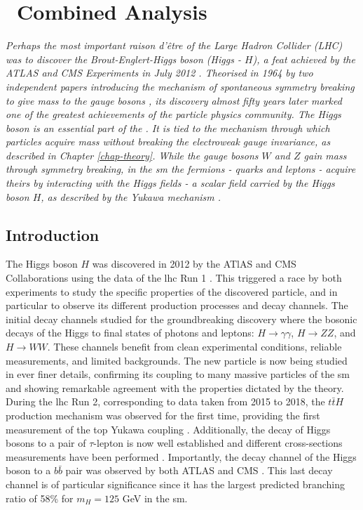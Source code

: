 \chapter[\boldvhbc\ Combined Analysis]{\vhbc\ Combined Analysis}\label{chap-VH}
\ChapFrame

\textit{Perhaps the most important \textit{raison d'être} of the \textit{Large Hadron Collider} (LHC) was to discover the Brout-Englert-Higgs boson (Higgs - $H$), a feat achieved by the ATLAS and CMS Experiments in July 2012 \cite{ATLAS:2012yve, CMS:2012qbp}. Theorised in 1964 by two independent papers introducing the mechanism of spontaneous symmetry breaking to give mass to the gauge bosons \cite{Englert:1964et,  PhysRevLett.13.508}, its discovery almost fifty years later marked one of the greatest achievements of the particle physics community. The Higgs boson is an essential part of the . It is tied to the mechanism through which particles acquire mass without breaking the electroweak gauge invariance, as described in Chapter \ref{chap-theory}. While the gauge bosons $W$ and $Z$ gain mass through symmetry breaking, in the \gls{sm} the fermions - quarks and leptons - acquire theirs by interacting with the Higgs fields - a scalar field carried by the Higgs boson $H$, as described by the Yukawa mechanism \cite{10.1143/PTPS.1.1}.}\\

\section{Introduction}
The Higgs boson $H$ \cite{Englert:1964et, PhysRevLett.13.508, Higgs:1964ia, PhysRevLett.13.585} was discovered in 2012 by the ATlAS and CMS Collaborations using the  data of the \gls{lhc} Run 1 \cite{ATLAS:2012yve, CMS:2012qbp}. This triggered a race by both experiments to study the specific properties of the discovered particle, and in particular to observe its different production processes and decay channels. The initial decay channels studied for the groundbreaking discovery where the bosonic decays of the Higgs to final states of photons and leptons: $H \rightarrow \gamma\gamma$, $H \rightarrow ZZ$, and $H \rightarrow WW$. These channels benefit from clean experimental conditions, reliable measurements, and limited backgrounds. The new particle is now being studied in ever finer details, confirming its coupling to many massive particles of the \gls{sm} and showing remarkable agreement with the properties dictated by the theory. During the \gls{lhc} Run 2, corresponding to data taken from 2015 to 2018, the $t\bar{t}H$ production mechanism was observed for the first time, providing the first measurement of the top Yukawa coupling \cite{ATLAS:2018mme, CMS:2018uxb}. Additionally, the decay of Higgs bosons to a pair of $\tau$-lepton is now well established and different cross-sections measurements have been performed \cite{atlasTauMeasu, CMS:2021gxc}. Importantly, the decay channel of the Higgs boson to a $b\bar{b}$ pair was observed by both ATLAS and CMS \cite{ATLAS:2018kot, CMS:2018nsn}. This last decay channel is of particular significance since it has the largest predicted branching ratio of 58\% for $m_H = 125$ GeV in the \gls{sm}. \\ 

